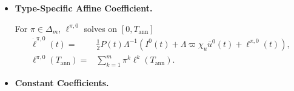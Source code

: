 \documentclass[12pt]{article}
\numberwithin{equation}{section}
\theoremstyle{definition}
\begin{document}
\begin{itemize}
\begin{equation}\label{eq:mf_b_vector}
b^k(t)
=
\frac{1}{2+\varpi\chi_u}
\begin{pmatrix}
-\chi_g g^k(t)\\
(2+\varpi\chi_u-\varpi\chi_g)\Gamma g^k(t)\\
\chi_g P(t)g^k(t)
\end{pmatrix}.
\end{equation}
Note that the conditions for \(\bar X^0\) and \(I^0\) are imposed at \(t=0\), whereas
the conditions for \(\ell^k\), \(k=1,\ldots,m\), are imposed at \(t=T\). The conditions at
\(T_{\mathrm{ann}}\) match the pre- and post-announcement mean inventories
and impact states and link \(\ell^0\) to the post-announcement affine
coefficients. Thus, \eqref{eq:mf_consistency_system} is a coupled
boundary-value problem rather than an initial-value problem, and its
solvability is not immediate.

The equilibrium mean flows are
\begin{subequations}\label{eq:mf_mu_closed_form}
\begin{align}
\bar u^0(t)
&=
-\frac{1}{2+\varpi\chi_u}\Lambda^{-1}
\left(P(t)\bar X^0(t)+I^0(t)+\ell^0(t)\right),
\label{eq:mf_pre_mu_closed_form}\\
\bar u^k(t)
&=
-\frac{1}{2+\varpi\chi_u}\Lambda^{-1}
\left(P(t)\bar X^k(t)+I^k(t)+\ell^k(t)+\Lambda\chi_g g^k(t)\right).
\label{eq:mf_post_mu_closed_form}
\end{align}
\end{subequations}

\item \textbf{Type-Specific Affine Coefficient.}

For \(\pi\in\Delta_m\), \(\ell^{\pi,0}\) solves on
\([0,T_{\mathrm{ann}}]\)
\begin{equation}\label{eq:mf_pre_ell}
\begin{aligned}
\dot\ell^{\pi,0}(t)
={}&
\frac12P(t)\Lambda^{-1}
\left(I^0(t)+\Lambda\varpi\chi_u\bar u^0(t)+\ell^{\pi,0}(t)\right),
\\
\ell^{\pi,0}(T_{\mathrm{ann}})
={}&\sum_{k=1}^m\pi^k\ell^k(T_{\mathrm{ann}}).
\end{aligned}
\end{equation}

\item \textbf{Constant Coefficients.}


\end{itemize}
\end{document}
